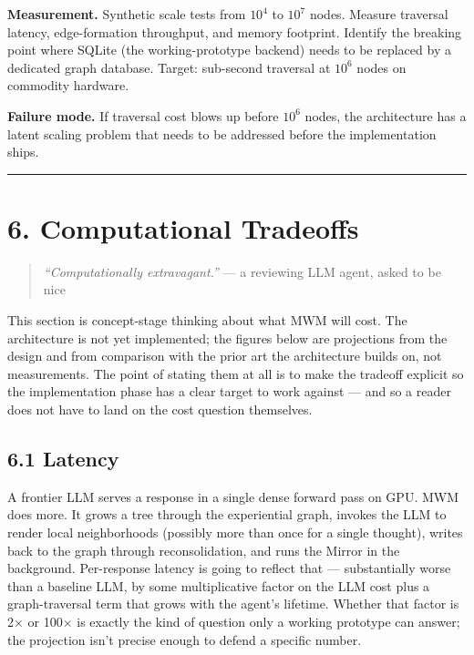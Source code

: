 \documentclass[12pt]{article}
\begin{document}
\textbf{Measurement.} Synthetic scale tests from \(10^{4}\) to \(10^{7}\) nodes. Measure traversal latency, edge-formation throughput, and memory footprint. Identify the breaking point where SQLite (the working-prototype backend) needs to be replaced by a dedicated graph database. Target: sub-second traversal at \(10^{6}\) nodes on commodity hardware.

\textbf{Failure mode.} If traversal cost blows up before \(10^{6}\) nodes, the architecture has a latent scaling problem that needs to be addressed before the implementation ships.

\begin{center}\rule{0.5\linewidth}{0.5pt}\end{center}

\section{6. Computational Tradeoffs}\label{computational-tradeoffs}

\begin{quote}
\emph{``Computationally extravagant.''}
--- a reviewing LLM agent, asked to be nice
\end{quote}

This section is concept-stage thinking about what MWM will cost. The architecture is not yet implemented; the figures below are projections from the design and from comparison with the prior art the architecture builds on, not measurements. The point of stating them at all is to make the tradeoff explicit so the implementation phase has a clear target to work against --- and so a reader does not have to land on the cost question themselves.

\subsection{6.1 Latency}\label{latency}

A frontier LLM serves a response in a single dense forward pass on GPU. MWM does more. It grows a tree through the experiential graph, invokes the LLM to render local neighborhoods (possibly more than once for a single thought), writes back to the graph through reconsolidation, and runs the Mirror in the background. Per-response latency is going to reflect that --- substantially worse than a baseline LLM, by some multiplicative factor on the LLM cost plus a graph-traversal term that grows with the agent's lifetime. Whether that factor is 2× or 100× is exactly the kind of question only a working prototype can answer; the projection isn't precise enough to defend a specific number.
\end{document}
